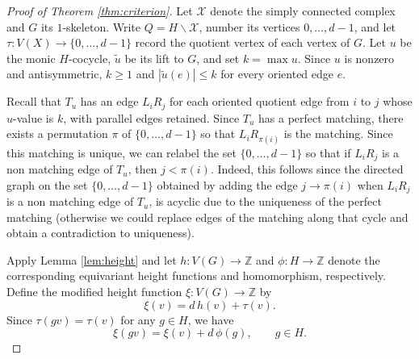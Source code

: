 \documentclass[11pt]{article}
\theoremstyle{remark}
\newcommand{\Z}{\mathbb Z}
\begin{document}
    
\begin{proof}[Proof of Theorem \ref{thm:criterion}]
Let $\mathcal X$ denote the simply connected complex and $G$ its
$1$-skeleton. Write $Q=H\backslash\mathcal X$, number its vertices
$0,\ldots,d-1$, and let $\tau:V(X)\to \{0,\ldots,d-1\}$ record the quotient vertex of each vertex of $G$. Let $u$ be the monic $H$-cocycle,  $\widetilde u$ be its lift to $G$, and set
$k=\max u$. Since $u$ is nonzero and antisymmetric, $k\geq 1$ and
$|\widetilde u(e)|\leq k$ for every oriented edge $e$.

Recall that $T_u$ has an edge $L_iR_j$ for each oriented quotient edge
from $i$ to $j$ whose $u$-value is $k$, with parallel edges retained. Since $T_u$ has a perfect matching, there exists a permutation $\pi$ of $\{0,\ldots, d-1\}$ so that $L_i R_{\pi(i)}$ is the matching. Since this matching is unique, we can relabel the set $\{0,\ldots, d-1\}$ so that if $L_i R_j$ is a non matching edge of $T_u$, then $j < \pi(i)$. Indeed, this follows since the directed graph on the set $\{0,\ldots, d-1\}$ obtained by adding the edge $j \to \pi(i)$ when $L_iR_j$ is a non matching edge of $T_u$, is acyclic due to the uniqueness of the perfect matching (otherwise we could replace edges of the matching along that cycle and obtain a contradiction to uniqueness).

Apply Lemma \ref{lem:height} and let $h:V(G)\to \Z$ and $\phi:H\to\Z$ denote the corresponding equivariant height functions and homomorphism, respectively.
Define the modified height function $\xi:V(G)\to\Z$ by
\begin{equation*}\label{eq:repaired-modified-height}
  \xi(v)=d\,h(v)+\tau(v).
\end{equation*}
Since $\tau(gv)=\tau(v)$ for any $g\in H$, we have
\begin{equation}\label{eq:repaired-modified-equivariance}
  \xi(gv)=\xi(v)+d\,\phi(g),\qquad g\in H.
\end{equation}


\end{proof}
\end{document}

